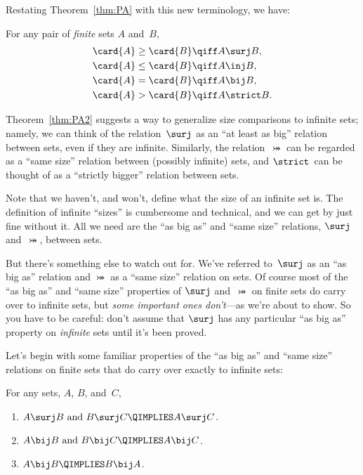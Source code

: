Restating Theorem~\ref{thm:PA} with this new terminology, we have:
\begin{theorem}\label{thm:PA2}
For any pair of \emph{finite} sets $A$ and~$B$,
\begin{align*}
    \card{A} \ge \card{B} & \qiff A \surj B, \\
    \card{A} \le \card{B} & \qiff A \inj B, \\
    \card{A} = \card{B} & \qiff A \bij B, \\
    \card{A} > \card{B} & \qiff A \strict B.
\end{align*}
\end{theorem}

Theorem~\ref{thm:PA2} suggests a way to generalize size comparisons
to infinite sets; namely, we can think of the relation~$\surj$ as an
``at least as big'' relation between sets, even if they are infinite.
Similarly, the relation~$\bij$ can be regarded as a ``same size''
relation between (possibly infinite) sets, and $\strict$~can be
thought of as a ``strictly bigger'' relation between sets.

Note that we haven't, and won't, define what the size of an infinite
set is.  The definition of infinite ``sizes'' is cumbersome and
technical, and we can get by just fine without it.  All we need are
the ``as big as'' and ``same size'' relations, $\surj$ and~$\bij$,
between sets.

But there's something else to watch out for.  We've referred
to~$\surj$ as an ``as big as'' relation and $\bij$ as a ``same size''
relation on sets.  Of course most of the ``as big as'' and ``same
size'' properties of $\surj$ and~$\bij$ on finite sets do carry over
to infinite sets, but \emph{some important ones don't}---as we're
about to show.  So you have to be careful: don't assume that $\surj$
has any particular ``as big as'' property on \emph{infinite} sets
until it's been proved.

Let's begin with some familiar properties of the ``as big as'' and
``same size'' relations on finite sets that do carry over exactly to
infinite sets:

\begin{theorem}\label{thm:infinite1}
For any sets, $A$, $B$, and~$C$,
\begin{enumerate}

\item
$\text{$A \surj B$ and $B \surj C$} \QIMPLIES A \surj C$.

\item
$\text{$A \bij B$ and $B \bij C$} \QIMPLIES A \bij C$.

\item
$A \bij B  \QIMPLIES B \bij A$.
\end{enumerate}
\end{theorem}


